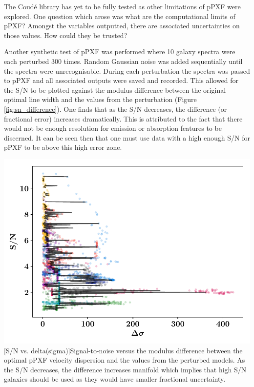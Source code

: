 \documentclass[12pt, twocolumn]{revtex4}    %
\begin{document}
The Coud{\'e} library has yet to be fully tested as other limitations of pPXF were explored. One question which arose was what are the computational limits of pPXF? Amongst the variables outputted, there are associated uncertainties on those values. How could they be trusted? 

Another synthetic test of pPXF was performed where 10 galaxy spectra were each perturbed 300 times. Random Gaussian noise was added sequentially until the spectra were unrecognisable. During each perturbation the spectra was passed to pPXF and all associated outputs were saved and recorded. This allowed for the S/N to be plotted against the modulus difference between the original optimal line width and the values from the perturbation (Figure \ref{fig:sn_difference}). One finds that as the S/N decreases, the difference (or fractional error) increases dramatically. This is attributed to the fact that there would not be enough resolution for emission or absorption features to be discerned. It can be seen then that one must use data with a high enough S/N for pPXF to be above this high error zone.


\begin{center}
\includegraphics[width=1.0\linewidth]{data/reprocessed_sn_vs_delta_sigma}
[S/N vs. delta(sigma)]{Signal-to-noise versus the modulus difference between the optimal pPXF velocity dispersion and the values from the perturbed models. As the S/N decreases, the difference increases manifold which implies that high S/N galaxies should be used as they would have smaller fractional uncertainty.}
\label{fig:sn_difference}
\end{center}
\end{document}
